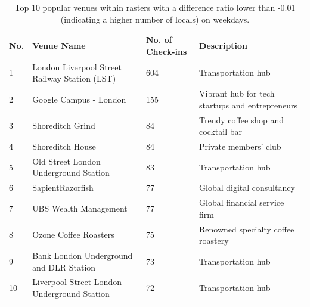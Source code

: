 \documentclass{article}
\theoremstyle{remark}
\begin{document}
\begin{table}[!h]
\centering
\caption{\label{tab:popular_venues_localspop_weekday}Top 10 popular venues within rasters with a difference ratio lower than -0.01 (indicating a higher number of locals) on weekdays.}
\begin{adjustbox}{max width=\textwidth, margin=0cm}
\begin{threeparttable}
\begin{tabular}{lp{5cm}lp{4cm}} \hline
No. & Venue Name & No. of Check-ins & Description \\ \hline
1 & London Liverpool Street Railway Station (LST) & 604 & Transportation hub \\
2 & Google Campus - London & 155 & Vibrant hub for tech startups and entrepreneurs \\
3 & Shoreditch Grind & 84 & Trendy coffee shop and cocktail bar \\
4 & Shoreditch House & 84 & Private members' club \\
5 & Old Street London Underground Station & 83 & Transportation hub \\
6 & SapientRazorfish & 77 & Global digital consultancy \\
7 & UBS Wealth Management & 77 & Global financial service firm \\
8 & Ozone Coffee Roasters & 75 & Renowned specialty coffee roastery \\
9 & Bank London Underground and DLR Station & 73 & Transportation hub \\
10 & Liverpool Street London Underground Station & 72 & Transportation hub \\ \hline
\end{tabular}
\end{threeparttable}
\end{adjustbox}
\end{table}
\end{document}

